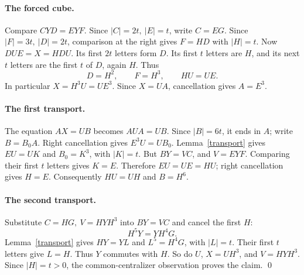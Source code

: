 \documentclass[11pt]{article}
\theoremstyle{remark}\newtheorem*{remark}{Remark}
\begin{document}
\paragraph{The forced cube.}
Compare \(CYD=EYF\). Since \(|C|=2t,\ |E|=t\), write \(C=EG\). Since \(|F|=3t,\ |D|=2t\), comparison at the right gives \(F=HD\) with \(|H|=t\). Now \(DUE=X=HDU\). Its first \(2t\) letters form \(D\). Its first \(t\) letters are \(H\), and its next \(t\) letters are the first \(t\) of \(D\), again \(H\). Thus
\[
 D=H^2,\qquad F=H^3,\qquad HU=UE.
\]
In particular \(X=H^3U=UE^3\). Since \(X=UA\), cancellation gives \(A=E^3\).

\paragraph{The first transport.}
The equation \(AX=UB\) becomes \(AUA=UB\). Since \(|B|=6t\), it ends in \(A\); write \(B=B_0 A\). Right cancellation gives \(E^3 U=U B_0\). Lemma~\ref{transport} gives \(EU=UK\) and \(B_0=K^3\), with \(|K|=t\). But \(BY=VC\), and \(V=EYF\). Comparing their first \(t\) letters gives \(K=E\). Therefore \(EU=UE=HU\); right cancellation gives \(H=E\). Consequently \(HU=UH\) and \(B=H^6\).

\paragraph{The second transport.}
Substitute \(C=HG,\ V=HYH^3\) into \(BY=VC\) and cancel the first \(H\):
\[
 H^5Y=YH^4G .
\]
Lemma~\ref{transport} gives \(HY=YL\) and \(L^5=H^4G\), with \(|L|=t\). Their first \(t\) letters give \(L=H\). Thus \(Y\) commutes with \(H\). So do \(U\), \(X=UH^3\), and \(V=HYH^3\). Since \(|H|=t>0\), the common-centralizer observation proves the claim. \qed
\end{document}
